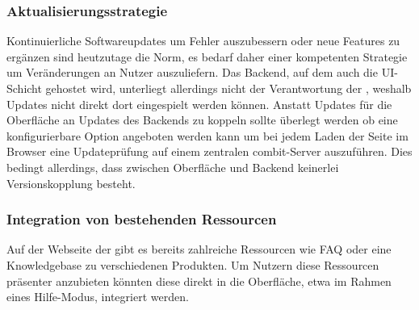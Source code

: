 \subsubsection{Aktualisierungsstrategie}
Kontinuierliche Softwareupdates um Fehler auszubessern oder neue Features zu ergänzen sind heutzutage die Norm, es bedarf daher einer kompetenten Strategie um Veränderungen an Nutzer auszuliefern. Das Backend, auf dem auch die UI-Schicht gehostet wird, unterliegt allerdings nicht der Verantwortung der , weshalb Updates nicht direkt dort eingespielt werden können. Anstatt Updates für die Oberfläche an Updates des Backends zu koppeln sollte überlegt werden ob eine konfigurierbare Option angeboten werden kann um bei jedem Laden der Seite im Browser eine Updateprüfung auf einem zentralen combit-Server auszuführen. Dies bedingt allerdings, dass zwischen Oberfläche und Backend keinerlei Versionskopplung besteht. 

\subsubsection{Integration von bestehenden Ressourcen}
Auf der Webseite der  gibt es bereits zahlreiche Ressourcen wie FAQ oder eine Knowledgebase zu verschiedenen Produkten. Um Nutzern diese Ressourcen präsenter anzubieten könnten diese direkt in die Oberfläche, etwa im Rahmen eines Hilfe-Modus, integriert werden.

